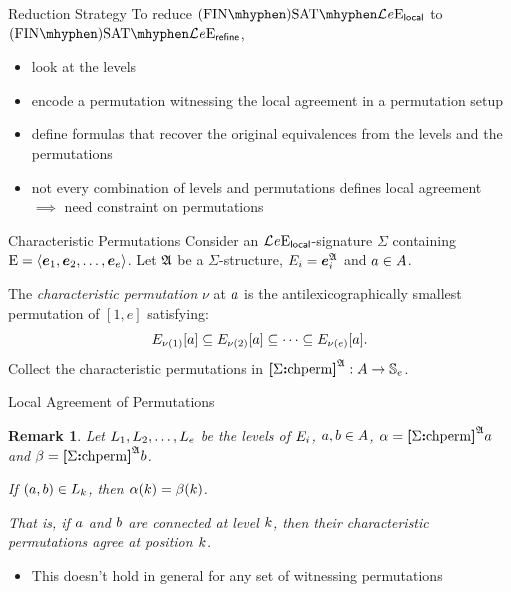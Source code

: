 \documentclass{beamer}
\newtheorem{remark}{Remark}
\begin{document}
\begin{frame}{Reduction Strategy}
To reduce $\FinASat{\Lvp\LL\nonv\nopow\Eea\sze\aglocal}$ to
$\FinASat{\Lvp\LL\nonv\nopow\Eea\sze\agrefine}$,
\begin{itemize}
  \item
  look at the levels
  
  \item
  encode a permutation witnessing the local agreement in a permutation setup
  
  \item
  define formulas that recover the original equivalences from the
  levels and the permutations
  
  \item
  not every combination of levels and permutations defines
  local agreement $\implies$ need constraint on permutations
\end{itemize}
\end{frame}

\begin{frame}{Characteristic Permutations}
Consider an $\mathcal{L}^{{}}_{{}}{e}\mathrm{E}_{\mathsf{local}}$-signature $\Sigma$ containing
${\mathrm{E}} = \left\langle \bm{e}_{1},\bm{e}_{2},\dots,\bm{e}_{e} \right\rangle$.
Let $\mathfrak{A}$ be a $\Sigma$-structure, $E_{i} =
\bm{e}_{i}^{\mathfrak{A}}$ and $a\in A$.

The \emph{characteristic permutation} $\nu$ at $a$ is the
antilexicographically smallest permutation of $[1,e]$ satisfying:
\[
E_{\nu(1)}[a] \subseteq E_{\nu(2)}[a] \subseteq \dots
\subseteq E_{\nu(e)}[a].
\]
Collect the characteristic permutations in ${\bm{[}\Sigma\mathord{\bm{:}}\mathrm{chperm}\bm{]}}^{\mathfrak{A}} : A \to
\mathbb{S}_{e}$.
\end{frame}

\begin{frame}{Local Agreement of Permutations}
\begin{remark}
Let $L_{1},L_{2},\dots,L_{e}$ be the levels of $E_{i}$,
$a,b\in A$,
$\alpha = {\bm{[}\Sigma\mathord{\bm{:}}\mathrm{chperm}\bm{]}}^{\mathfrak{A}}a$
and $\beta = {\bm{[}\Sigma\mathord{\bm{:}}\mathrm{chperm}\bm{]}}^{\mathfrak{A}}b$.

If $(a,b)\in L_{k}$, then $\alpha(k) = \beta(k)$.

That is, if $a$ and $b$ are connected at level $k$, then their
characteristic permutations agree at position $k$.
\end{remark}
\begin{itemize}
  \item
  This doesn't hold in general for any set of witnessing permutations
\end{itemize}
\end{frame}
\end{document}
